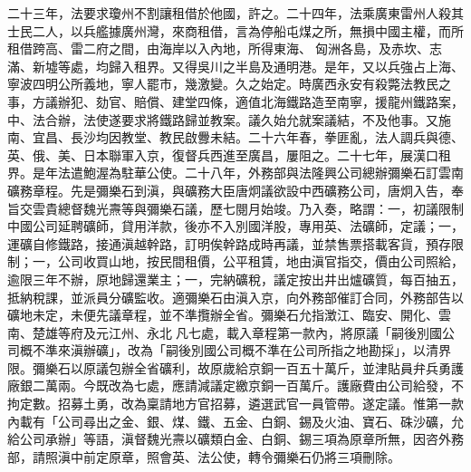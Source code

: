 \begin{pinyinscope}
二十三年，法要求瓊州不割讓租借於他國，許之。二十四年，法乘廣東雷州人殺其士民二人，以兵艦據廣州灣，來商租借，言為停船屯煤之所，無損中國主權，而所租借跨高、雷二府之間，由海岸以入內地，所得東海、匈洲各島，及赤坎、志滿、新墟等處，均歸入租界。又得吳川之半島及通明港。是年，又以兵強占上海、寧波四明公所義地，寧人罷巿，幾激變。久之始定。時廣西永安有殺斃法教民之事，方議辦犯、劾官、賠償、建堂四條，適值北海鐵路造至南寧，援龍州鐵路案，中、法合辦，法使遂要求將鐵路歸並教案。議久始允就案議結，不及他事。又施南、宜昌、長沙均因教堂、教民啟釁未結。二十六年春，拳匪亂，法人調兵與德、英、俄、美、日本聯軍入京，復督兵西進至廣昌，屢阻之。二十七年，展漢口租界。是年法遣鮑渥為駐華公使。二十八年，外務部與法隆興公司總辦彌樂石訂雲南礦務章程。先是彌樂石到滇，與礦務大臣唐炯議欲設中西礦務公司，唐炯入告，奉旨交雲貴總督魏光燾等與彌樂石議，歷七閱月始竣。乃入奏，略謂：一，初議限制中國公司延聘礦師，貸用洋款，後亦不入別國洋股，專用英、法礦師，定議；一，運礦自修鐵路，接通滇越幹路，訂明俟幹路成時再議，並禁售票搭載客貨，預存限制；一，公司收買山地，按民間租價，公平租賃，地由滇官指交，價由公司照給，逾限三年不辦，原地歸還業主；一，完納礦稅，議定按出井出爐礦質，每百抽五，抵納稅課，並派員分礦監收。適彌樂石由滇入京，向外務部催訂合同，外務部告以礦地未定，未便先議章程，並不準攬辦全省。彌樂石允指澂江、臨安、開化、雲南、楚雄等府及元江州、永北凡七處，載入章程第一款內，將原議「嗣後別國公司概不準來滇辦礦」，改為「嗣後別國公司概不準在公司所指之地勘採」，以清界限。彌樂石以原議包辦全省礦利，故原歲給京銅一百五十萬斤，並津貼員弁兵勇護廠銀二萬兩。今既改為七處，應請減議定繳京銅一百萬斤。護廠費由公司給發，不拘定數。招募土勇，改為稟請地方官招募，遴選武官一員管帶。遂定議。惟第一款內載有「公司尋出之金、銀、煤、鐵、五金、白銅、錫及火油、寶石、硃沙礦，允給公司承辦」等語，滇督魏光燾以礦類白金、白銅、錫三項為原章所無，因咨外務部，請照滇中前定原章，照會英、法公使，轉令彌樂石仍將三項刪除。


\end{pinyinscope}
